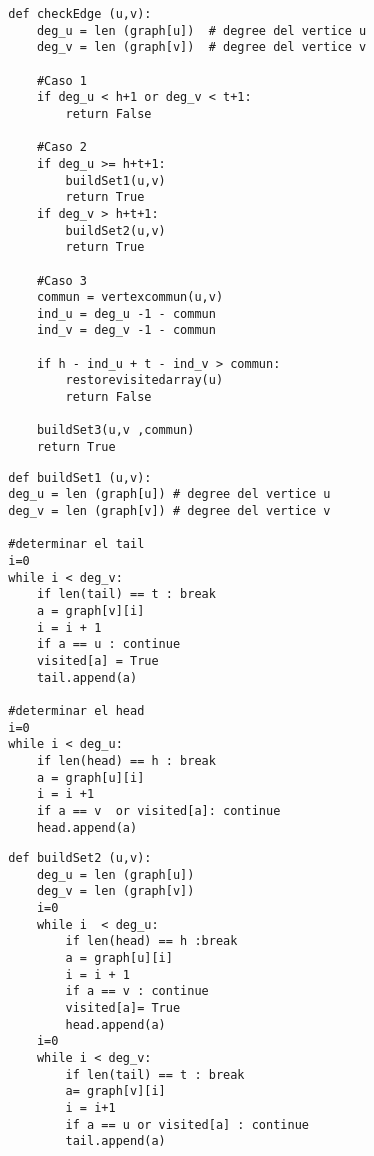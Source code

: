 \documentclass[12pt]{article}
\begin{document}
    \begin{verbatim}
        def checkEdge (u,v):
            deg_u = len (graph[u])  # degree del vertice u 
            deg_v = len (graph[v])  # degree del vertice v
            
            #Caso 1 
            if deg_u < h+1 or deg_v < t+1:
                return False 

            #Caso 2
            if deg_u >= h+t+1:
                buildSet1(u,v)
                return True
            if deg_v > h+t+1:
                buildSet2(u,v)
                return True 
            
            #Caso 3 
            commun = vertexcommun(u,v) 
            ind_u = deg_u -1 - commun  
            ind_v = deg_v -1 - commun   

            if h - ind_u + t - ind_v > commun:  
                restorevisitedarray(u)
                return False 

            buildSet3(u,v ,commun)
            return True
    \end{verbatim}

    \begin{verbatim}
        def buildSet1 (u,v):
        deg_u = len (graph[u]) # degree del vertice u 
        deg_v = len (graph[v]) # degree del vertice v

        #determinar el tail 
        i=0
        while i < deg_v:
            if len(tail) == t : break 
            a = graph[v][i]
            i = i + 1 
            if a == u : continue 
            visited[a] = True 
            tail.append(a)

        #determinar el head
        i=0
        while i < deg_u:
            if len(head) == h : break
            a = graph[u][i]
            i = i +1 
            if a == v  or visited[a]: continue 
            head.append(a)
    \end{verbatim}

    \begin{verbatim}
        def buildSet2 (u,v):
            deg_u = len (graph[u]) 
            deg_v = len (graph[v])
            i=0 
            while i  < deg_u:
                if len(head) == h :break
                a = graph[u][i]
                i = i + 1 
                if a == v : continue 
                visited[a]= True 
                head.append(a)
            i=0 
            while i < deg_v:
                if len(tail) == t : break
                a= graph[v][i]
                i = i+1
                if a == u or visited[a] : continue
                tail.append(a)
    \end{verbatim}
\end{document}
